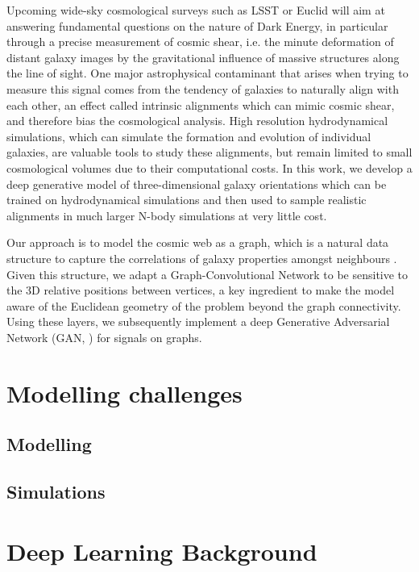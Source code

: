 \documentclass[a4paper,fleqn,usenatbib]{mnras}
\begin{document}
Upcoming wide-sky cosmological surveys such as LSST or Euclid will aim at answering fundamental questions on the 
nature of Dark Energy, in particular through a precise measurement of cosmic shear, i.e. the minute deformation of distant
galaxy images by the gravitational influence of massive structures along the line of sight. One major astrophysical contaminant
that arises when trying to measure this signal comes from the tendency of galaxies to naturally align with each other, an effect 
called  intrinsic alignments which can mimic cosmic shear, and therefore bias the cosmological analysis. High resolution
hydrodynamical simulations, which can simulate the formation and evolution of individual galaxies, are valuable tools 
to study these alignments, but remain limited to small cosmological volumes due to their computational costs. In this work,
we develop a deep generative model of three-dimensional galaxy orientations which can be trained on hydrodynamical
simulations and then used to sample realistic alignments in much larger N-body simulations at very little cost.

Our approach is to model the cosmic web as a graph, which is a natural data structure to capture the correlations of galaxy properties
amongst neighbours \cite{Coutinho2016}. Given this structure, we adapt a Graph-Convolutional Network \cite{Defferrard2016} to be sensitive
to the 3D relative positions between vertices, a key ingredient to make the model aware of the  Euclidean geometry of the problem beyond the graph connectivity. Using these layers, we subsequently implement a deep Generative Adversarial Network (GAN,  \cite{Goodfellow2014}) for signals on graphs.


\section{Modelling challenges}

	\subsection{Modelling}

	\subsection{Simulations}


\section{Deep Learning Background}
\end{document}
